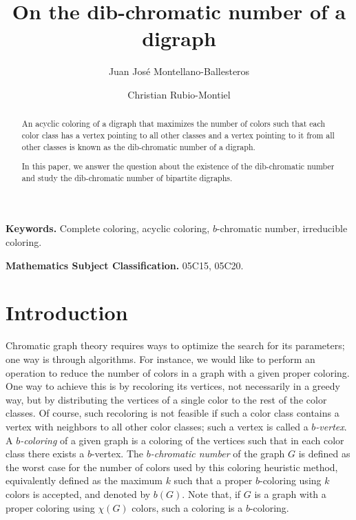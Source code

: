 \documentclass[12pt]{article}
\title{On the dib-chromatic number of a digraph}
\author{Juan José Montellano-Ballesteros\footnotemark[2] \and Christian Rubio-Montiel\footnotemark[3]}
\begin{document}
\maketitle

\def\thefootnote{\fnsymbol{footnote}}

\begin{abstract} 
An acyclic coloring of a digraph that maximizes the number of colors such that each color class has a vertex pointing to all other classes and a vertex pointing to it from all other classes is known as the dib-chromatic number of a digraph.

In this paper, we answer the question about the existence of the dib-chromatic number and study the dib-chromatic number of bipartite digraphs.
\end{abstract}
\textbf{Keywords.} Complete coloring, acyclic coloring, $b$-chromatic number, irreducible coloring.

\textbf{Mathematics Subject Classification.} 05C15, 05C20.


\section{Introduction}

Chromatic graph theory requires ways to optimize the search for its parameters; one way is through algorithms. For instance, we would like to perform an operation to reduce the number of colors in a graph with a given proper coloring. One way to achieve this is by recoloring its vertices, not necessarily in a greedy way, but by distributing the vertices of a single color to the rest of the color classes. Of course, such recoloring is not feasible if such a color class contains a vertex with neighbors to all other color classes; such a vertex is called a \textit{$b$-vertex}. A \emph{$b$-coloring} of a given graph is a coloring of the vertices such that in each color class there exists a $b$-vertex.
The \textit{$b$-chromatic number} of the graph $G$ is defined as the worst case for the number of colors used by this coloring heuristic method, equivalently defined as the maximum $k$ such that a proper $b$-coloring using $k$ colors is accepted, and denoted by $b(G)$. Note that, if $G$ is a graph with a proper coloring using $\chi(G)$ colors, such a coloring is a $b$-coloring.
\end{document}
